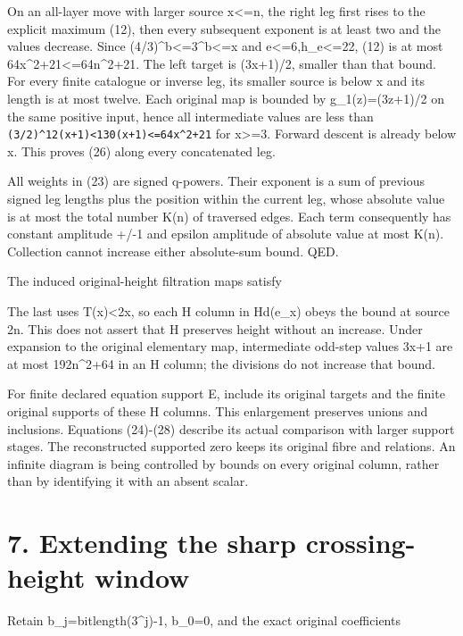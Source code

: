 On an all-layer move with larger source x\textless=n, the right leg
first rises to the explicit maximum (12), then every subsequent exponent
is at least two and the values decrease. Since
(4/3)\^{}b\textless=3\^{}b\textless=x and e\textless=6,h\_e\textless=22,
(12) is at most 64x\^{}2+21\textless=64n\^{}2+21. The left target is
(3x+1)/2, smaller than that bound. For every finite catalogue or inverse
leg, its smaller source is below x and its length is at most twelve.
Each original map is bounded by g\_1(z)=(3z+1)/2 on the same positive
input, hence all intermediate values are less than
\nolinkurl{(3/2)^12(x+1)<130(x+1)<=64x^2+21} for x\textgreater=3.
Forward descent is already below x. This proves (26) along every
concatenated leg.

All weights in (23) are signed q-powers. Their exponent is a sum of
previous signed leg lengths plus the position within the current leg,
whose absolute value is at most the total number K(n) of traversed
edges. Each term consequently has constant amplitude +/-1 and epsilon
amplitude of absolute value at most K(n). Collection cannot increase
either absolute-sum bound. QED.

The induced original-height filtration maps satisfy


The last uses T(x)\textless2x, so each H column in Hd(e\_x) obeys the
bound at source 2n. This does not assert that H preserves height without
an increase. Under expansion to the original elementary map,
intermediate odd-step values 3x+1 are at most 192n\^{}2+64 in an H
column; the divisions do not increase that bound.

For finite declared equation support E, include its original targets and
the finite original supports of these H columns. This enlargement
preserves unions and inclusions. Equations (24)-(28) describe its actual
comparison with larger support stages. The reconstructed supported zero
keeps its original fibre and relations. An infinite diagram is being
controlled by bounds on every original column, rather than by
identifying it with an absent scalar.

\section{7. Extending the sharp crossing-height window}

Retain b\_j=bitlength(3\^{}j)-1, b\_0=0, and the exact original
coefficients

